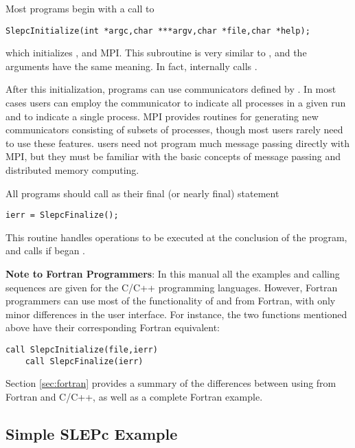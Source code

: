 	Most \slepc programs begin with a call to 
	\begin{Verbatim}[fontsize=\small]
	SlepcInitialize(int *argc,char ***argv,char *file,char *help);
	\end{Verbatim}
which initializes \slepc, \petsc and MPI. This subroutine is very similar to , and the arguments have the same meaning. In fact, internally  calls .

	After this initialization, \slepc programs can use communicators defined by \petsc. In most cases users can employ the communicator  to indicate all processes in a given run and  to indicate a single process. MPI provides routines for generating new communicators consisting of subsets of processes, though most users rarely need to use these features. \slepc users need not program much message passing directly with MPI, but they must be familiar with the basic concepts of message passing and distributed memory computing.

	All \slepc programs should call  as their final (or nearly final) statement
	\begin{Verbatim}[fontsize=\small]
	ierr = SlepcFinalize();
	\end{Verbatim}
This routine handles operations to be executed at the conclusion of the program, and calls  if  began \petsc.

\medskip
\textbf{Note to Fortran Programmers}: In this manual all the examples and calling sequences are given for the C/C++ programming languages. However, Fortran programmers can use most of the functionality of \slepc and \petsc from Fortran, with only minor differences in the user interface. For instance, the two functions mentioned above have their corresponding Fortran equivalent:
	\begin{Verbatim}[fontsize=\small]
	call SlepcInitialize(file,ierr)
	call SlepcFinalize(ierr)
	\end{Verbatim}
Section \ref{sec:fortran} provides a summary of the differences between using \slepc from Fortran and C/C++, as well as a complete Fortran example.

\subsection{Simple SLEPc Example}
\label{sec:simpleex}

